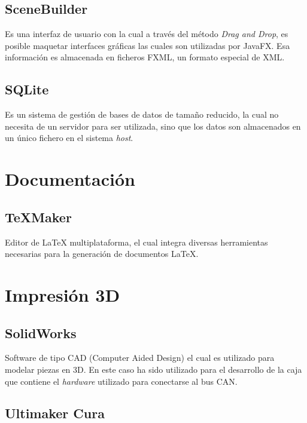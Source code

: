\subsection{SceneBuilder}\label{scenebuilder}

Es una interfaz de usuario con la cual a través del método \emph{Drag and Drop}, es posible maquetar interfaces gráficas las cuales son utilizadas por JavaFX. Esa información es almacenada en ficheros FXML, un formato especial de XML.

\subsection{SQLite}\label{sqlite}

Es un sistema de gestión de bases de datos de tamaño reducido, la cual no necesita de un servidor para ser utilizada, sino que los datos son almacenados en un único fichero en el sistema \emph{host}.

\section{Documentación}\label{documentacion}

\subsection{TeXMaker}\label{textmaker}

Editor de \LaTeX{} multiplataforma, el cual integra diversas herramientas necesarias para la generación de documentos \LaTeX{}.

\section{Impresión 3D}\label{impresion3d}

\subsection{SolidWorks}\label{solidworks}

Software de tipo CAD (Computer Aided Design) el cual es utilizado para modelar piezas en 3D. En este caso ha sido utilizado para el desarrollo de la caja que contiene el \emph{hardware} utilizado para conectarse al bus CAN.

\subsection{Ultimaker Cura}\label{ultimaker_cura}

